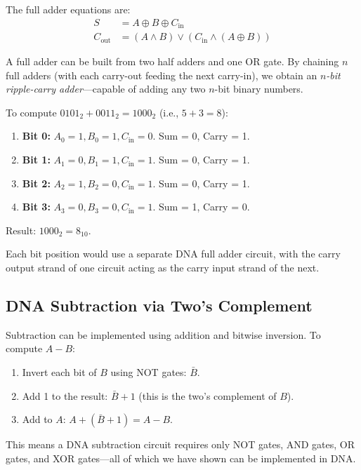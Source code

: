 The full adder equations are:
\begin{align}
S &= A \oplus B \oplus C_{\text{in}} \\
C_{\text{out}} &= (A \wedge B) \vee (C_{\text{in}} \wedge (A \oplus B))
\end{align}

A full adder can be built from two half adders and one OR gate. By chaining $n$ full adders (with each carry-out feeding the next carry-in), we obtain an \emph{$n$-bit ripple-carry adder}---capable of adding any two $n$-bit binary numbers.

\begin{example}[4-Bit DNA Addition: $5 + 3 = 8$]
To compute $0101_2 + 0011_2 = 1000_2$ (i.e., $5 + 3 = 8$):
\begin{enumerate}[leftmargin=1.5em]
  \item \textbf{Bit 0:} $A_0 = 1, B_0 = 1, C_{\text{in}} = 0$. Sum = 0, Carry = 1.
  \item \textbf{Bit 1:} $A_1 = 0, B_1 = 1, C_{\text{in}} = 1$. Sum = 0, Carry = 1.
  \item \textbf{Bit 2:} $A_2 = 1, B_2 = 0, C_{\text{in}} = 1$. Sum = 0, Carry = 1.
  \item \textbf{Bit 3:} $A_3 = 0, B_3 = 0, C_{\text{in}} = 1$. Sum = 1, Carry = 0.
\end{enumerate}
Result: $1000_2 = 8_{10}$. \checkmark

Each bit position would use a separate DNA full adder circuit, with the carry output strand of one circuit acting as the carry input strand of the next.
\end{example}

\subsection{DNA Subtraction via Two's Complement}

Subtraction can be implemented using addition and bitwise inversion. To compute $A - B$:
\begin{enumerate}[leftmargin=1.8em]
  \item Invert each bit of $B$ using NOT gates: $\bar{B}$.
  \item Add 1 to the result: $\bar{B} + 1$ (this is the two's complement of $B$).
  \item Add to $A$: $A + (\bar{B} + 1) = A - B$.
\end{enumerate}

This means a DNA subtraction circuit requires only NOT gates, AND gates, OR gates, and XOR gates---all of which we have shown can be implemented in DNA.

